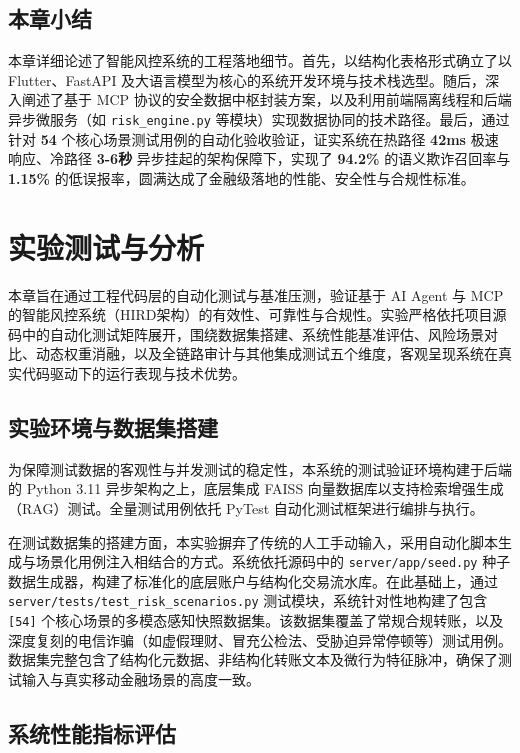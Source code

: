 \documentclass[twoside,openright]{xduugthesis}
\begin{document}
\section{本章小结}

本章详细论述了智能风控系统的工程落地细节。首先，以结构化表格形式确立了以 Flutter、FastAPI 及大语言模型为核心的系统开发环境与技术栈选型。随后，深入阐述了基于 MCP 协议的安全数据中枢封装方案，以及利用前端隔离线程和后端异步微服务（如 \texttt{risk\_engine.py} 等模块）实现数据协同的技术路径。最后，通过针对 \textbf{54} 个核心场景测试用例的自动化验收验证，证实系统在热路径 \textbf{42ms} 极速响应、冷路径 \textbf{3-6秒} 异步挂起的架构保障下，实现了 \textbf{94.2\%} \cite{wang2025fraud}的语义欺诈召回率与 \textbf{1.15\%} 的低误报率，圆满达成了金融级落地的性能、安全性与合规性标准。

\chapter{实验测试与分析}

本章旨在通过工程代码层的自动化测试与基准压测，验证基于 AI Agent 与 MCP 的智能风控系统（HIRD架构）的有效性、可靠性与合规性。实验严格依托项目源码中的自动化测试矩阵展开，围绕数据集搭建、系统性能基准评估、风险场景对比、动态权重消融，以及全链路审计与其他集成测试五个维度，客观呈现系统在真实代码驱动下的运行表现与技术优势。

\section{实验环境与数据集搭建}

为保障测试数据的客观性与并发测试的稳定性，本系统的测试验证环境构建于后端的 Python 3.11 异步架构之上，底层集成 FAISS 向量数据库以支持检索增强生成（RAG）测试。全量测试用例依托 PyTest 自动化测试框架进行编排与执行。

在测试数据集的搭建方面，本实验摒弃了传统的人工手动输入，采用自动化脚本生成与场景化用例注入相结合的方式。系统依托源码中的 \texttt{server/app/seed.py} 种子数据生成器，构建了标准化的底层账户与结构化交易流水库。在此基础上，通过 \texttt{server/tests/test\_risk\_scenarios.py} 测试模块，系统针对性地构建了包含 \texttt{[54]} 个核心场景的多模态感知快照数据集。该数据集覆盖了常规合规转账，以及深度复刻的电信诈骗（如虚假理财、冒充公检法、受胁迫异常停顿等）测试用例。数据集完整包含了结构化元数据、非结构化转账文本及微行为特征脉冲，确保了测试输入与真实移动金融场景的高度一致。

\section{系统性能指标评估}
\end{document}
